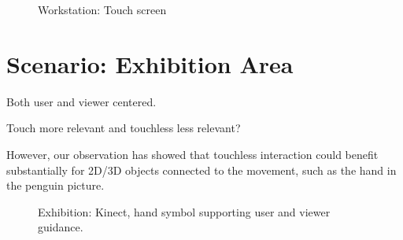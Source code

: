 \documentclass[review,journal]{vgtc}         %
\begin{document}
\begin{figure}[htb]
	\centering
	\caption{Workstation: Touch screen}
	\label{img:touch_workstation}
\end{figure}

\section{Scenario: Exhibition Area}

Both user and viewer centered.

Touch more relevant and touchless less relevant?

However, our observation has showed that touchless interaction could benefit substantially for 2D/3D objects connected to the movement, such as the hand in the penguin picture.

\begin{figure}[htb]
	\centering
	\caption{Exhibition: Kinect, hand symbol supporting user and viewer guidance.}
	\label{img:exhibition_kinect}
\end{figure}
\end{document}
